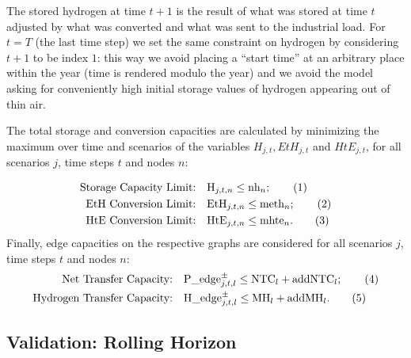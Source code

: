 The stored hydrogen at time $t+1$ is the result of what was stored at time $t$ adjusted by what was converted and what was sent to the industrial load. For $t=T$ (the last time step) we set the same constraint on hydrogen by considering $t+1$ to be index $1$: this way we avoid placing a ``start time'' at an arbitrary place within the year (time is rendered modulo the year) and we avoid the model asking for conveniently high initial storage values of hydrogen appearing out of thin air.

The total storage and conversion capacities are calculated by minimizing the maximum over time and scenarios of the variables $H_{j,t}, EtH_{j,t}$ and $HtE_{j,t}$, for all scenarios \(j\), time steps \(t\) and nodes \(n\):

\begin{align*}
    \text{Storage Capacity Limit:} \quad & \text{H}_{j,t,n} \leq \text{nh}_n ;\stepcounter{equation}\tag{\theequation}\label{constr_nh}\\
    \text{EtH Conversion Limit:} \quad & \text{EtH}_{j,t,n} \leq \text{meth}_n; \stepcounter{equation}\tag{\theequation}\label{myeq1}\\
    \text{HtE Conversion Limit:} \quad & \text{HtE}_{j,t,n} \leq \text{mhte}_n .\stepcounter{equation}\tag{\theequation}\label{myeq1}
\end{align*}
Finally, edge capacities on the respective graphs are considered for all scenarios \(j\), time steps \(t\) and nodes \(n\):
\begin{align*}
    \text{Net Transfer Capacity:} \quad & \text{P\_edge}^\pm_{j,t,l}\le\text{NTC}_l + \text{addNTC}_l ;\stepcounter{equation}\tag{\theequation}\label{myeq1}\\
    \text{Hydrogen Transfer Capacity:} \quad & \text{H\_edge}^\pm_{j,t,l}\le\text{MH}_l + \text{addMH}_l.\stepcounter{equation}\tag{\theequation}\label{myeq1}
\end{align*}







\subsection{Validation: Rolling Horizon}

